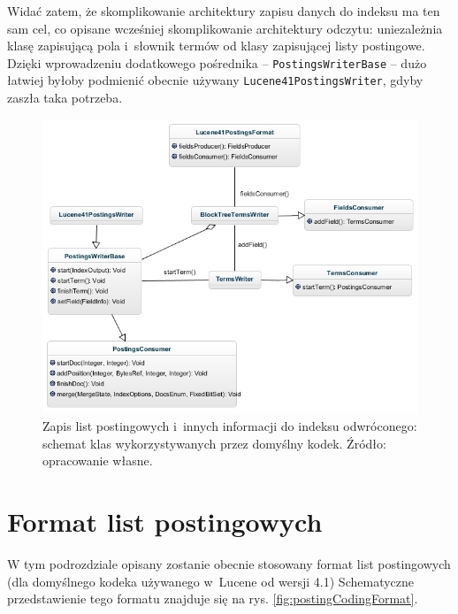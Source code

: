 Widać zatem, że skomplikowanie architektury zapisu danych do indeksu ma ten sam cel, co opisane wcześniej skomplikowanie architektury odczytu: uniezależnia klasę zapisującą pola i~słownik termów od klasy zapisującej listy postingowe. Dzięki wprowadzeniu dodatkowego pośrednika -- \texttt{PostingsWriterBase} -- dużo łatwiej byłoby podmienić obecnie używany \texttt{Lucene41PostingsWriter}, gdyby zaszła taka potrzeba.

\begin{figure}[p]
 \includegraphics[scale=0.65]{pictures/Lucene41PostingsFormatWrite_1.jpg}
 \caption{Zapis list postingowych i~innych informacji do indeksu odwróconego: schemat klas wykorzystywanych przez domyślny kodek. Źródło: opracowanie własne. \label{fig:postingFormatWrite}}
\end{figure}

\section{Format list postingowych}

W tym podrozdziale opisany zostanie obecnie stosowany format list postingowych (dla domyślnego kodeka używanego w~Lucene od wersji 4.1) Schematyczne przedstawienie tego formatu znajduje się na rys. \ref{fig:postingCodingFormat}.


